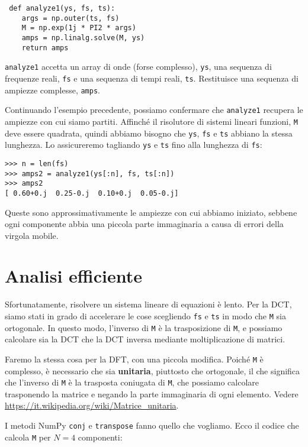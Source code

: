 \documentclass[12pt]{book} \usepackage[width=5.5in,height=8.5in, hmarginratio=3:2,vmarginratio=1:1]{geometry}
\begin{document}
\begin{verbatim} def analyze1(ys, fs, ts):
    args = np.outer(ts, fs)
    M = np.exp(1j * PI2 * args)
    amps = np.linalg.solve(M, ys)
    return amps
 \end{verbatim} 

{\tt analyze1} accetta un array di onde (forse complesso), {\tt ys}, una sequenza di frequenze reali, {\tt fs} e una sequenza di tempi reali, {\tt ts}. Restituisce una sequenza di ampiezze complesse, {\tt amps}.

Continuando l'esempio precedente, possiamo confermare che {\tt analyze1} recupera le ampiezze con cui siamo partiti. Affinché il risolutore di sistemi lineari funzioni, {\tt M} deve essere quadrata, quindi abbiamo bisogno che {\tt ys}, {\tt fs} e {\tt ts} abbiano la stessa lunghezza. Lo assicureremo tagliando {\tt ys} e {\tt ts} fino alla lunghezza di {\tt fs}:

\begin{verbatim} 
>>> n = len(fs)
>>> amps2 = analyze1(ys[:n], fs, ts[:n])
>>> amps2
[ 0.60+0.j  0.25-0.j  0.10+0.j  0.05-0.j]
 \end{verbatim} 

Queste sono approssimativamente le ampiezze con cui abbiamo iniziato, sebbene ogni componente abbia una piccola parte immaginaria a causa di errori della virgola mobile.

\section{Analisi efficiente} 

Sfortunatamente, risolvere un sistema lineare di equazioni è lento. Per la DCT, siamo stati in grado di accelerare le cose scegliendo {\tt fs} e {\tt ts} in modo che {\tt M} sia ortogonale. In questo modo, l'inverso di {\tt M} è la trasposizione di {\tt M}, e possiamo calcolare sia la DCT che la DCT inversa mediante moltiplicazione di matrici.

Faremo la stessa cosa per la DFT, con una piccola modifica. Poiché {\tt M} è complesso, è necessario che sia {\bf unitaria}, piuttosto che ortogonale, il che significa che l'inverso di {\tt M} è la trasposta coniugata di {\tt M}, che possiamo calcolare trasponendo la matrice e negando la parte immaginaria di ogni elemento. Vedere \url{https://it.wikipedia.org/wiki/Matrice_unitaria}.

I metodi NumPy {\tt conj} e {\tt transpose} fanno quello che vogliamo. Ecco il codice che calcola {\tt M} per $N=4$ componenti:
\end{document}
